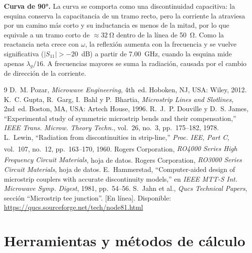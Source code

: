 \documentclass[11pt,letterpaper]{article}
\begin{document}
\textbf{Curva de \ang{90}.} La curva se comporta como una discontinuidad capacitiva: la esquina conserva la capacitancia de un tramo recto, pero la corriente la atraviesa por un camino más corto y su inductancia es menos de la mitad, por lo que equivale a un tramo corto de $\approx\SI{32}{\ohm}$ dentro de la línea de \SI{50}{\ohm}. Como la reactancia neta crece con $\omega$, la reflexión aumenta con la frecuencia y se vuelve significativa ($|S_{11}|>-20$~dB) a partir de \SI{7.00}{GHz}, cuando la esquina mide apenas $\lambda_g/16$. A frecuencias mayores se suma la radiación, causada por el cambio de dirección de la corriente.
\begin{thebibliography}{9}
 D.~M. Pozar, \emph{Microwave Engineering}, 4th~ed. Hoboken, NJ, USA: Wiley, 2012.
 K.~C. Gupta, R.~Garg, I.~Bahl y P.~Bhartia, \emph{Microstrip Lines and Slotlines}, 2nd~ed. Boston, MA, USA: Artech House, 1996.
 R.~J.~P. Douville y D.~S. James, ``Experimental study of symmetric microstrip bends and their compensation,'' \emph{IEEE Trans. Microw. Theory Techn.}, vol.~26, no.~3, pp.~175--182, 1978.
 L.~Lewin, ``Radiation from discontinuities in strip-line,'' \emph{Proc. IEE, Part C}, vol.~107, no.~12, pp.~163--170, 1960.
 Rogers Corporation, \emph{RO4000\textsuperscript{\textregistered} Series High Frequency Circuit Materials}, hoja de datos.
 Rogers Corporation, \emph{RO3000\textsuperscript{\textregistered} Series Circuit Materials}, hoja de datos.
 E.~Hammerstad, ``Computer-aided design of microstrip couplers with accurate discontinuity models,'' en \emph{IEEE MTT-S Int. Microwave Symp. Digest}, 1981, pp.~54--56.
 S.~Jahn et al., \emph{Qucs Technical Papers}, sección ``Microstrip tee junction''. [En línea]. Disponible: \url{https://qucs.sourceforge.net/tech/node81.html}
\end{thebibliography}

\appendix

\section{Herramientas y métodos de cálculo}
\label{ap:metodos}
\end{document}
